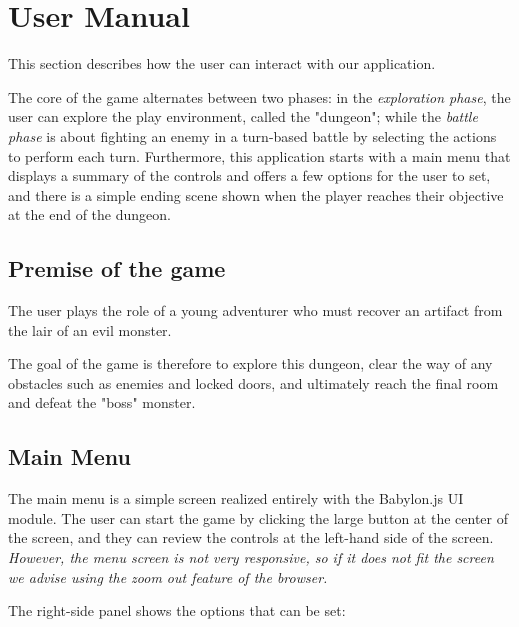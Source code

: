 
{
\let\clearpage\relax

\chapter{User Manual}
}

This section describes how the user can interact with our application.

The core of the game alternates between two phases: in the \textit{exploration phase}, the user can explore the play environment, called the "dungeon"; while the \textit{battle phase} is about fighting an enemy in a turn-based battle by selecting the actions to perform each turn. Furthermore, this application starts with a main menu that displays a summary of the controls and offers a few options for the user to set, and there is a simple ending scene shown when the player reaches their objective at the end of the dungeon.

\section{Premise of the game}

The user plays the role of a young adventurer who must recover an artifact from the lair of an evil monster.

The goal of the game is therefore to explore this dungeon, clear the way of any obstacles such as enemies and locked doors, and ultimately reach the final room and defeat the "boss" monster.

\section{Main Menu}

The main menu is a simple screen realized entirely with the Babylon.js UI module. The user can start the game by clicking the large button at the center of the screen, and they can review the controls at the left-hand side of the screen. \textit{However, the menu screen is not very responsive, so if it does not fit the screen we advise using the zoom out feature of the browser.}

The right-side panel shows the options that can be set:

